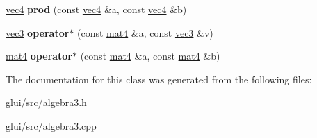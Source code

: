 \begin{DoxyCompactItemize}
\item 
\hypertarget{classvec4_a63ceed040a54841b149af112fe18d491}{\hyperlink{classvec4}{vec4} {\bfseries prod} (const \hyperlink{classvec4}{vec4} \&a, const \hyperlink{classvec4}{vec4} \&b)}\label{classvec4_a63ceed040a54841b149af112fe18d491}

\item 
\hypertarget{classvec4_a3a7a7dfc514a58f3c889b48fa4745815}{\hyperlink{classvec3}{vec3} {\bfseries operator$\ast$} (const \hyperlink{classmat4}{mat4} \&a, const \hyperlink{classvec3}{vec3} \&v)}\label{classvec4_a3a7a7dfc514a58f3c889b48fa4745815}

\item 
\hypertarget{classvec4_a15e77864e523807c2e4d9172f58cc96b}{\hyperlink{classmat4}{mat4} {\bfseries operator$\ast$} (const \hyperlink{classmat4}{mat4} \&a, const \hyperlink{classmat4}{mat4} \&b)}\label{classvec4_a15e77864e523807c2e4d9172f58cc96b}

\end{DoxyCompactItemize}


The documentation for this class was generated from the following files\-:\begin{DoxyCompactItemize}
\item 
glui/src/algebra3.\-h\item 
glui/src/algebra3.\-cpp\end{DoxyCompactItemize}
